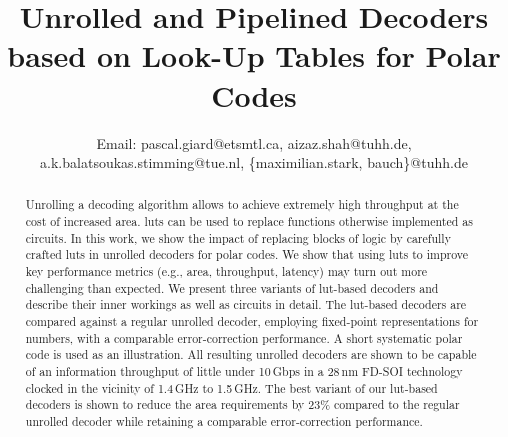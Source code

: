 \documentclass[conference,letterpaper]{IEEEtran}
\def\papertitle{Unrolled and Pipelined Decoders based on Look-Up Tables for Polar Codes}
\begin{document}


\title{\papertitle}

\author{
  Email: pascal.giard@etsmtl.ca, aizaz.shah@tuhh.de, a.k.balatsoukas.stimming@tue.nl, \{maximilian.stark, bauch\}@tuhh.de}%

\maketitle

\begin{abstract} Unrolling a decoding algorithm allows to achieve extremely high throughput at the cost of increased area. \Glspl{lut} can be used to replace functions otherwise implemented as circuits. In this work, we show the impact of replacing blocks of logic by carefully crafted \glspl{lut} in unrolled decoders for polar codes. We show that using \glspl{lut} to improve key performance metrics (e.g., area, throughput, latency) may turn out more challenging than expected. We present three variants of \gls{lut}-based decoders and describe their inner workings as well as circuits in detail. The \gls{lut}-based decoders are compared against a regular unrolled decoder, employing fixed-point representations for numbers, with a comparable error-correction performance. A short systematic polar code is used as an illustration. All resulting unrolled decoders are shown to be capable of an information throughput of little under 10\,Gbps in a 28\,nm FD-SOI technology clocked in the vicinity of 1.4\,GHz to 1.5\,GHz. The best variant of our \gls{lut}-based decoders is shown to reduce the area requirements by 23\% compared to the regular unrolled decoder while retaining a comparable error-correction performance.
\end{abstract}
\end{document}

